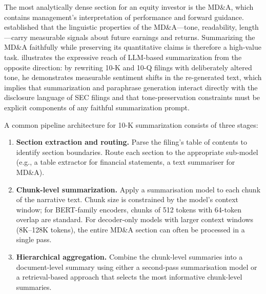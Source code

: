 The most analytically dense section for an equity investor is the MD\&A, which contains
management's interpretation of performance and forward guidance. \citet{loughran2011liability}
established that the linguistic properties of the MD\&A---tone, readability, length---carry
measurable signals about future earnings and returns. Summarizing the MD\&A faithfully
while preserving its quantitative claims is therefore a high-value task.
\citet{Lehner2024} illustrates the expressive reach of LLM-based summarization
from the opposite direction: by rewriting 10-K and 10-Q filings with deliberately
altered tone, he demonstrates measurable sentiment shifts in the re-generated text,
which implies that summarization and paraphrase generation interact directly with the
disclosure language of SEC filings and that tone-preservation constraints must be
explicit components of any faithful summarization prompt.

A common pipeline architecture for 10-K summarization consists of three stages:

\begin{enumerate}
  \item \textbf{Section extraction and routing.} Parse the filing's table of contents
        to identify section boundaries. Route each section to the appropriate sub-model
        (e.g., a table extractor for financial statements, a text summariser for MD\&A).
  \item \textbf{Chunk-level summarization.} Apply a summarisation model to each chunk of
        the narrative text. Chunk size is constrained by the model's context window;
        for BERT-family encoders, chunks of 512 tokens with 64-token overlap are standard.
        For decoder-only models with larger context windows (8K--128K tokens), the entire
        MD\&A section can often be processed in a single pass.
  \item \textbf{Hierarchical aggregation.} Combine the chunk-level summaries into a
        document-level summary using either a second-pass summarisation model or a
        retrieval-based approach that selects the most informative chunk-level summaries.
\end{enumerate}

